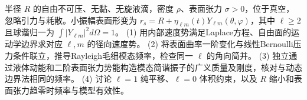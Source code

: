 半径 \(R\) 的自由不可压、无黏、无旋液滴，密度 \(\rho\)、表面张力 \(\sigma>0\)，位于真空，忽略引力与耗散。小振幅表面形变为 \(r_s=R+\eta_{\ell m}(t)Y_{\ell m}(\theta,\varphi)\)，其中 \(\ell\ge2\) 且球谐归一为 \(\int|Y_{\ell m}|^2d\Omega=1\)。
(1) 用内部速度势满足Laplace方程、自由面的运动学边界求对应 \(\ell,m\) 的径向速度势。
(2) 将表面曲率一阶变化与线性Bernoulli压力条件联立，推导Rayleigh毛细模态频率，检查同一 \(\ell\) 的角向简并。
(3) 独立通过液体动能和二阶表面张力势能构造模态简谐振子的广义质量及刚度，核对与动态边界法相同的频率。
(4) 讨论 \(\ell=1\) 纯平移、\(\ell=0\) 体积约束，以及 \(R\) 缩小和表面张力趋零时频率与模型有效性。
